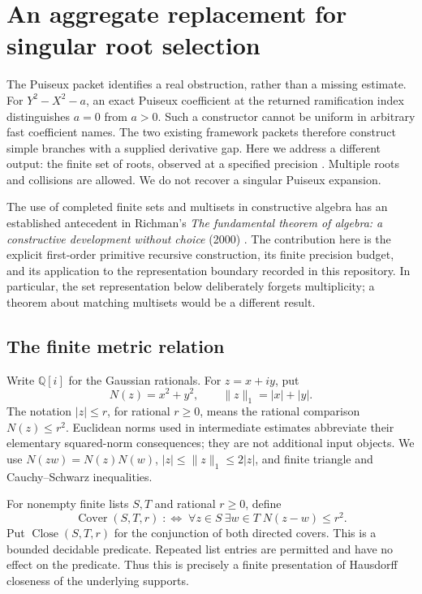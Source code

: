 \section{An aggregate replacement for singular root selection}
\label{sec:rootsets}

The Puiseux packet identifies a real obstruction, rather than a missing
estimate. For \(Y^2-X^2-a\), an exact Puiseux coefficient at the returned
ramification index distinguishes \(a=0\) from \(a>0\). Such a constructor
cannot be uniform in arbitrary fast coefficient names. The two existing
framework packets therefore construct simple branches with a supplied
derivative gap. Here we address a different output: the finite set of
roots, observed at a specified precision \cite{repo-puiseux,repo-contracts}.
Multiple roots and collisions
are allowed. We do not recover a singular Puiseux expansion.

The use of completed finite sets and multisets in constructive algebra
has an established antecedent in Richman's \emph{The fundamental theorem
of algebra: a constructive development without choice} (2000)
\cite{richman2000}. The
contribution here is the explicit first-order primitive recursive
construction, its finite precision budget, and its application to the
representation boundary recorded in this repository. In particular, the
set representation below deliberately forgets multiplicity; a theorem
about matching multisets would be a different result.

\subsection{The finite metric relation}

Write \(\mathbb Q[i]\) for the Gaussian rationals. For \(z=x+iy\), put
\[
 N(z)=x^2+y^2,\qquad \|z\|_1=|x|+|y|.
\]
The notation \(|z|\le r\), for rational \(r\ge0\), means the rational
comparison \(N(z)\le r^2\). Euclidean norms used in intermediate estimates
abbreviate their elementary squared-norm consequences; they are not
additional input objects. We use
\(N(zw)=N(z)N(w)\), \(|z|\le\|z\|_1\le2|z|\), and finite
triangle and Cauchy--Schwarz inequalities.

For nonempty finite lists \(S,T\) and rational \(r\ge0\), define
\[
 \operatorname{Cover}(S,T,r)
 \;:\Longleftrightarrow\;
 \forall z\in S\ \exists w\in T\; N(z-w)\le r^2.
\]
Put \(\operatorname{Close}(S,T,r)\) for the conjunction of both directed
covers. This is a bounded decidable predicate. Repeated list entries are
permitted and have no effect on the predicate. Thus this is precisely a
finite presentation of Hausdorff closeness of the underlying supports.


